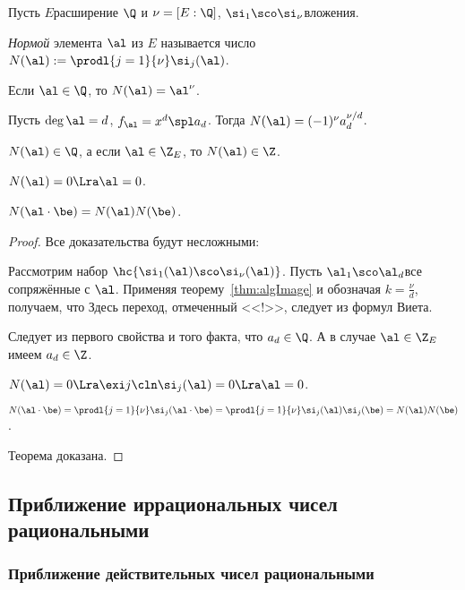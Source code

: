 \documentclass[a4paper]{article}
\begin{document}
Пусть $E$\т расширение $\Q$ и $\nu=[E:\Q]$, $\si_1\sco \si_\nu$\т вложения.

\begin{df}
\emph{Нормой} элемента $\al$ из $E$ называется число $N(\al):=\prodl{j=1}{\nu}\si_j(\al)$.
\end{df}

\begin{ex}
Если $\al \in \Q$, то $N(\al)=\al^{\nu}$.
\end{ex}

\begin{theorem}
\begin{nums}{-2}
\item Пусть $\deg\al=d$, $f_{\al}=x^d\spl a_d$. Тогда $N(\al)=(-1)^\nu a_d^{\nu/d}$.
\item $N(\al)\in\Q$, а если $\al\in \Z_E$, то $N(\al)\in\Z$.
\item $N(\al)=0\Lra\al=0$.
\item $N(\al\cdot\be)=N(\al)N(\be)$.
\end{nums}
\end{theorem}
\begin{proof}
Все доказательства будут несложными:
\begin{nums}{-2}
\item Рассмотрим набор $\hc{\si_1(\al)\sco \si_\nu(\al)}$. Пусть $\al_1\sco \al_d$\т все сопряжённые с $\al$.
      Применяя теорему~\ref{thm:algImage} и обозначая $k = \frac{\nu}{d}$, получаем, что
      Здесь переход, отмеченный <<!>>, следует из формул Виета.
\item Следует из первого свойства и того факта, что $a_d\in\Q$. А в случае $\al\in\Z_E$ имеем $a_d\in\Z$.
\item $N(\al)=0\Lra\exi j\cln \si_j(\al)=0\Lra\al=0$.
\item $N(\al\cdot\be)=\prodl{j=1}{\nu}\si_j(\al\cdot\be)=\prodl{j=1}{\nu}\si_j(\al)\si_j(\be)=N(\al)N(\be)$.
\end{nums}
Теорема доказана.
\end{proof}

\subsection{Приближение иррациональных чисел рациональными}

\subsubsection{Приближение действительных чисел рациональными}
\end{document}
